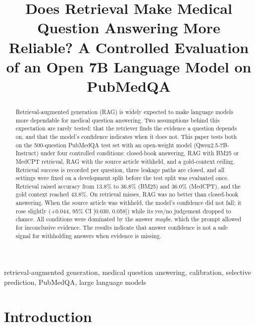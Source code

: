 \documentclass[conference]{IEEEtran}
\begin{document}
\title{Does Retrieval Make Medical Question Answering More Reliable? A Controlled Evaluation of an Open 7B Language Model on PubMedQA}

\author{
\and
{}
\and
{}
}

\maketitle

\begin{abstract}
Retrieval-augmented generation (RAG) is widely expected to make language models
more dependable for medical question answering. Two assumptions behind this
expectation are rarely tested: that the retriever finds the evidence a question
depends on, and that the model's confidence indicates when it does not. This
paper tests both on the 500-question PubMedQA test set with an open-weight model
(Qwen2.5-7B-Instruct) under four controlled conditions: closed-book answering,
RAG with BM25 or MedCPT retrieval, RAG with the source article withheld, and a
gold-context ceiling. Retrieval success is recorded per question, three leakage
paths are closed, and all settings were fixed on a development split before the
test split was evaluated once. Retrieval raised accuracy from 13.8\% to 36.8\%
(BM25) and 36.0\% (MedCPT), and the gold context reached 43.8\%. On retrieval
misses, RAG was no better than closed-book answering. When the source article
was withheld, the model's confidence did not fall; it rose slightly
(+0.044, 95\% CI [0.030, 0.058]) while its yes/no judgement dropped to chance.
All conditions were dominated by the answer \emph{maybe}, which the prompt
allowed for inconclusive evidence. The results indicate that answer confidence
is not a safe signal for withholding answers when evidence is missing.
\end{abstract}

\begin{IEEEkeywords}
retrieval-augmented generation, medical question answering, calibration,
selective prediction, PubMedQA, large language models
\end{IEEEkeywords}

\section{Introduction}
\end{document}
